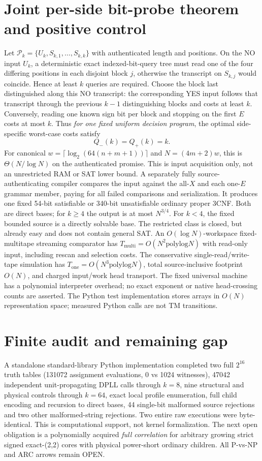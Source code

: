 \documentclass[11pt]{article}
\begin{document}
\section{Joint per-side bit-probe theorem and positive control}
Let $\mathcal P_k=\{U_k,S_{k,1},\ldots,S_{k,k}\}$ with authenticated length and positions. On the NO input $U_k$, a deterministic exact indexed-bit-query tree must read one of the four differing positions in each disjoint block $j$, otherwise the transcript on $S_{k,j}$ would coincide. Hence at least $k$ queries are required. Choose the block last distinguished along this NO transcript: the corresponding YES input follows that transcript through the previous $k-1$ distinguishing blocks and costs at least $k$. Conversely, reading one known sign bit per block and stopping on the first $E$ costs at most $k$. Thus \emph{for one fixed uniform decision program}, the optimal side-specific worst-case costs satisfy
\[
 Q_-(k)=Q_+(k)=k.
\]
For canonical $w=\lceil\log_2(64(n+m+1))\rceil$ and $N=(4m+2)w$, this is $\Theta(N/\log N)$ on the authenticated promise. This is input acquisition only, not an unrestricted RAM or SAT lower bound.
A separately fully source-authenticating compiler compares the input against the all-$X$ and each one-$E$ grammar member, paying for all failed comparisons and serialization. It produces one fixed 54-bit satisfiable or 340-bit unsatisfiable ordinary proper 3CNF. Both are direct bases; for $k\ge4$ the output is at most $N^{3/4}$. For $k<4$, the fixed bounded source is a directly solvable base. The restricted class is closed, but already easy and does not contain general SAT. An $O(\log N)$-workspace fixed-multitape streaming comparator has $T_{\mathrm{multi}}=O(N^2\mathrm{polylog}N)$ with read-only input, including rescan and selection costs. The conservative single-read/write-tape simulation has $T_{\mathrm{one}}=O(N^3\mathrm{polylog}N)$, total source-inclusive footprint $O(N)$, and charged input/work head transport. The fixed universal machine has a polynomial interpreter overhead; no exact exponent or native head-crossing counts are asserted. The Python test implementation stores arrays in $O(N)$ representation space; measured Python calls are not TM transitions.
\section{Finite audit and remaining gap}
A standalone standard-library Python implementation completed two full $2^{16}$ truth tables (131072 assignment evaluations, 0 vs 1024 witnesses), 47042 independent unit-propagating DPLL calls through $k=8$, nine structural and physical controls through $k=64$, exact local profile enumeration, full child encoding and recursion to direct bases, 44 single-bit malformed source rejections and two other malformed-string rejections. Two entire raw executions were byte-identical. This is computational support, not kernel formalization. The next open obligation is a polynomially acquired \emph{full correlation} for arbitrary growing strict signed exact-(2,2) cores with physical power-short ordinary children. All P-vs-NP and ARC arrows remain OPEN.
\end{document}
